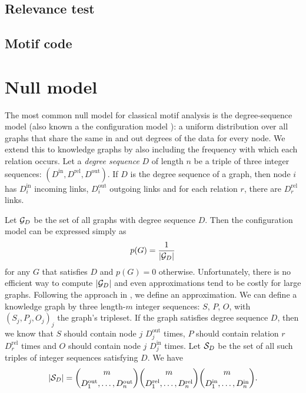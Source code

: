 \documentclass[11pt]{article}
\newcommand{\G}{{\cal G}}
\begin{document}
\subsection{Relevance test}

\label{section:relevance-test}




\subsection{Motif code}



\section{Null model}

\label{section:null-model}

The most common null model for classical motif analysis is the degree-sequence model (also known a the configuration model \cite{}): a uniform distribution over all graphs that share the same in and out degrees of the data for every node. We extend this to knowledge graphs by also including the frequency with which each relation occurs. Let a \emph{degree sequence} $D$ of length $n$ be a triple of three integer sequences: $(D^\text{in}, D^\text{rel}, D^\text{out})$. If $D$ is the degree sequence of a graph, then node $i$ has $D^\text{in}_i$ incoming links,  $D^\text{out}_i$ outgoing links and for each relation $r$, there are $D^\text{rel}_r$ links.

Let $\G_D$ be the set of all graphs with degree sequence $D$. Then the configuration model can be expressed simply as
\[
p(G) = \frac{1}{|\G_D|}
\]
for any $G$ that satisfies $D$ and $p(G) = 0$ otherwise. Unfortunately, there is no efficient way to compute $|\G_D|$ and even approximations tend to be costly for large graphs. Following the approach in \cite{bloem2017large}, we define an approximation. 
We can define a knowledge graph by three length-$m$ integer sequences: $S$, $P$, $O$, with ${(S_j, P_j, O_j)}_j$ the graph's tripleset. If the graph satisfies degree sequence $D$, then we know that $S$ should contain node $j$ $D^\text{out}_j$ times, $P$ should contain relation $r$ $D^\text{rel}_r$ times and $O$ should contain node $j$ $D^\text{in}_j$ times.  Let ${\cal S}_D$ be the set of all such triples of integer sequences satisfying $D$. We have 
\[
|{\cal S}_D| =
 {m \choose {D_1^\text{out}, \ldots, D_n^\text{out}} }
 {m \choose {D_1^\text{rel}, \ldots, D_n^\text{rel}} }
 {m \choose {D_1^\text{in}, \ldots, D_n^\text{in}} } \text{.}
\]
\end{document}
